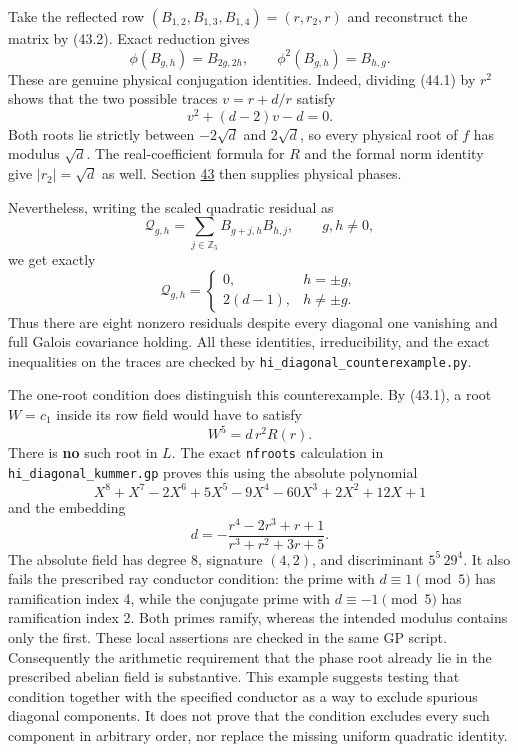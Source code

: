 \documentclass[11pt,reqno]{amsart}
\theoremstyle{plain}
\begin{document}
Take the reflected row \((B_{1,2},B_{1,3},B_{1,4})=(r,r_2,r)\)
and reconstruct the matrix by (43.2). Exact reduction gives
\[
 \phi(B_{g,h})=B_{2g,2h},\qquad
 \phi^2(B_{g,h})=B_{h,g}.
\]
These are genuine physical conjugation identities. Indeed, dividing
(44.1) by \(r^2\) shows that the two possible traces \(v=r+d/r\)
satisfy
\[
 v^2+(d-2)v-d=0.
\]
Both roots lie strictly between \(-2\sqrt d\) and \(2\sqrt d\),
so every physical root of \(f\) has modulus \(\sqrt d\). The
real-coefficient formula for \(R\) and the formal norm identity give
\(|r_2|=\sqrt d\) as well. Section \hyperref[sec:43]{43} then supplies physical phases.

Nevertheless, writing the scaled quadratic residual as
\[
 \mathcal Q_{g,h}=\sum_{j\in\mathbb Z_5}B_{g+j,h}B_{h,j},
 \qquad g,h\ne0,
\]
we get exactly
\begin{equation*}
 \boxed{\mathcal Q_{g,h}=
 \begin{cases}
 0,&h=\pm g,\\
 2(d-1),&h\ne\pm g.
 \end{cases}} \tag{44.2}
\end{equation*}
Thus there are eight nonzero residuals despite every diagonal one
vanishing and full Galois covariance holding. All these identities,
irreducibility, and the exact inequalities on the traces are checked
by \texttt{hi\_\allowbreak diagonal\_\allowbreak counterexample.py}.

The one-root condition does distinguish this counterexample. By (43.1),
a root \(W=c_1\) inside its row field would have to satisfy
\[
 W^5=d\,r^2R(r).
\]
There is \textbf{no} such root in \(L\). The exact \texttt{nfroots} calculation
in \texttt{hi\_\allowbreak diagonal\_\allowbreak kummer.gp} proves this using the absolute polynomial
\[
 X^8+X^7-2X^6+5X^5-9X^4-60X^3+2X^2+12X+1
\]
and the embedding
\[
 d=-\frac{r^4-2r^3+r+1}{r^3+r^2+3r+5}.
\]
The absolute field has degree 8, signature \((4,2)\), and discriminant
\(5^5\,29^4\). It also fails the prescribed ray conductor condition:
the prime with \(d\equiv1\pmod5\) has ramification index 4, while
the conjugate prime with \(d\equiv-1\pmod5\) has ramification index 2.
Both primes ramify, whereas the intended modulus contains only the
first. These local assertions are checked in the same GP script.
Consequently the arithmetic requirement that the phase root already
lie in the prescribed abelian field is substantive. This example
suggests testing that condition together with the specified conductor as a way to exclude spurious
diagonal components. It does not prove that the condition excludes every such
component in arbitrary order, nor replace the missing uniform
quadratic identity.
\end{document}
